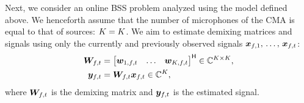 \documentclass[sip,biber]{now-journal}
\begin{document}
Next, we consider an online BSS problem analyzed using the model defined above.
We henceforth assume that the number of microphones of the CMA is equal to that of sources: $\Mic = \Src$.
\renewcommand{\Mic}{\Src}%
We aim to estimate demixing matrices and signals using only the currently and previously observed signals $\bm{x} _{f,1},\, \dots,\, \bm{x} _{f,t}$:
\begin{align}
  \Demix _{\ft} &= \begin{bmatrix} \demix _{1,\ft} & \dots & \demix _{\Src,\ft} \end{bmatrix} ^{\hermite} \in \C ^{\Src \times \Mic}, \\
  \Est _{\ft} &= \Demix _{\ft} \Obs _{\ft} \in \C ^{\Src},\label{eq:bss:sep}
\end{align}
where $\Demix _{\ft}$ is the demixing matrix and $\Est _{\ft}$ is the estimated signal.
\end{document}
